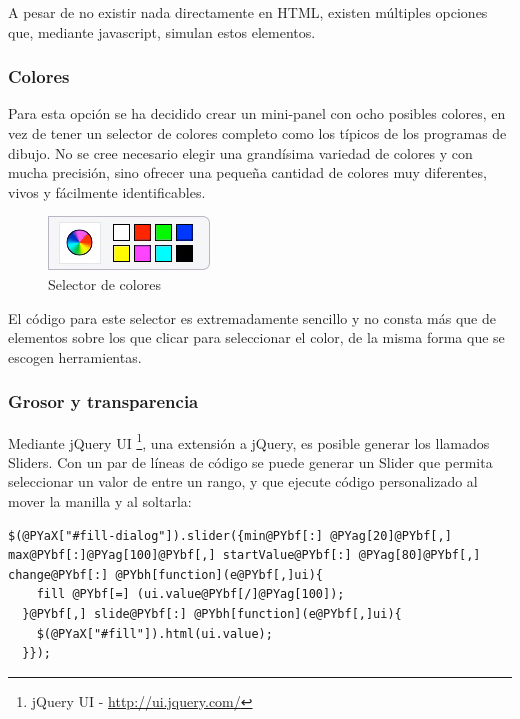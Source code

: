 A pesar de no existir nada directamente en HTML, existen múltiples opciones que, mediante javascript, simulan estos elementos.

\subsubsection{Colores} %
\label{ssub:colores}
Para esta opción se ha decidido crear un mini-panel con ocho posibles colores, en vez de tener un selector de colores completo como los típicos de los programas de dibujo. No se cree necesario elegir una grandísima variedad de colores y con mucha precisión, sino ofrecer una pequeña cantidad de colores muy diferentes, vivos y fácilmente identificables.

\begin{figure}[h!]
\centering
\includegraphics{color_selector.png}
\caption{Selector de colores}\label{fig:color_selector}
\end{figure}

El código para este selector es extremadamente sencillo y no consta más que de elementos sobre los que clicar para seleccionar el color, de la misma forma que se escogen herramientas.

\subsubsection{Grosor y transparencia} %
\label{ssub:grosor_y_transparencia}
Mediante jQuery UI \footnote{jQuery UI - \url{http://ui.jquery.com/}}, una extensión a jQuery, es posible generar los llamados Sliders. Con un par de líneas de código se puede generar un Slider que permita seleccionar un valor de entre un rango, y que ejecute código personalizado al mover la manilla y al soltarla:
\begin{Verbatim}[commandchars=@\[\]]
  $(@PYaX["#fill-dialog"]).slider({min@PYbf[:] @PYag[20]@PYbf[,] max@PYbf[:]@PYag[100]@PYbf[,] startValue@PYbf[:] @PYag[80]@PYbf[,] change@PYbf[:] @PYbh[function](e@PYbf[,]ui){
    fill @PYbf[=] (ui.value@PYbf[/]@PYag[100]);
  }@PYbf[,] slide@PYbf[:] @PYbh[function](e@PYbf[,]ui){
    $(@PYaX["#fill"]).html(ui.value);
  }});
\end{Verbatim}


